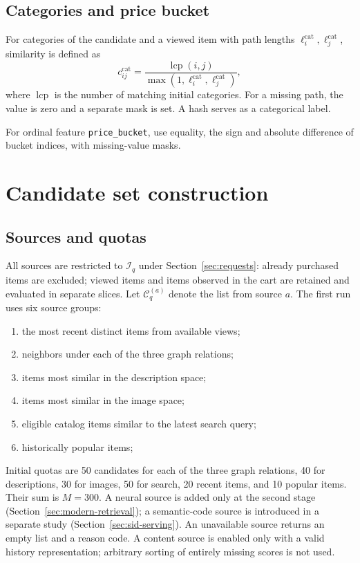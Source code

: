 \documentclass[12pt,a4paper]{article}
\newcommand{\code}[1]{{\ttfamily\small\nolinkurl{#1}}}
\theoremstyle{plainru}
\begin{document}
\subsection{Categories and price bucket}

For categories of the candidate and a viewed item with path lengths
$\ell_i^{\mathrm{cat}},\ell_j^{\mathrm{cat}}$, similarity is defined as
\begin{equation}\label{eq:model-category-similarity}
c_{ij}^{\mathrm{cat}}=
\frac{\operatorname{lcp}(i,j)}
 {\max(1,\ell_i^{\mathrm{cat}},\ell_j^{\mathrm{cat}})},
\end{equation}
where $\operatorname{lcp}$ is the number of matching initial categories.
For a missing path, the value is zero and a separate mask is set.
A hash serves as a categorical label.

For ordinal feature \code{price_bucket}, use equality,
the sign and absolute difference of bucket indices, with missing-value masks.

\section{Candidate set construction}\label{sec:model-candidates}

\subsection{Sources and quotas}

All sources are restricted to $\mathcal I_q$ under Section~\ref{sec:requests}:
already purchased items are excluded; viewed items and items observed
in the cart are retained and evaluated in separate slices.
Let $\mathcal C_q^{(a)}$ denote the list from source $a$.
The first run uses six source groups:
\begin{enumerate}
\item the most recent distinct items from available views;
\item neighbors under each of the three graph relations;
\item items most similar in the description space;
\item items most similar in the image space;
\item eligible catalog items similar to the latest search query;
\item historically popular items;
\end{enumerate}
Initial quotas are 50 candidates for each of the three graph relations,
40 for descriptions, 30 for images, 50 for search,
20 recent items, and 10 popular items. Their sum is \(M=300\).
A neural source is added only at the second stage
(Section~\ref{sec:modern-retrieval}); a semantic-code source is introduced
in a separate study (Section~\ref{sec:sid-serving}).
An unavailable source returns an empty list and a reason code.
A content source is enabled only with a valid history
representation; arbitrary sorting of entirely missing scores is not used.
\end{document}

